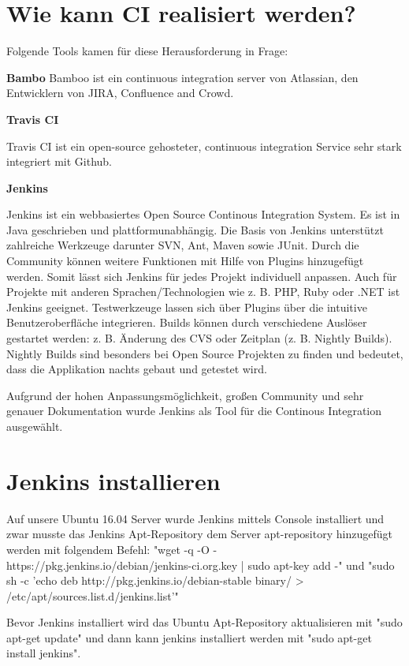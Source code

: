 \section{Wie kann CI realisiert werden?}\label{sec:whyci}
Folgende Tools kamen für diese Herausforderung in Frage:

\textbf{Bambo}
Bamboo ist ein continuous integration server von Atlassian, den Entwicklern von JIRA, Confluence and Crowd. 

\textbf{Travis CI}

Travis CI ist ein open-source gehosteter, continuous integration Service sehr stark integriert mit Github.

\textbf{Jenkins}

Jenkins ist ein webbasiertes Open Source Continous Integration System. Es ist in Java geschrieben und plattformunabhängig. Die Basis von Jenkins unterstützt zahlreiche Werkzeuge darunter SVN, Ant, Maven sowie JUnit. Durch die Community können weitere Funktionen mit Hilfe von Plugins hinzugefügt werden. Somit lässt sich Jenkins für jedes Projekt individuell anpassen. Auch für Projekte mit anderen Sprachen/Technologien wie z. B. PHP, Ruby oder .NET ist Jenkins geeignet. Testwerkzeuge lassen sich über Plugins über die intuitive Benutzeroberfläche integrieren. Builds können durch verschiedene Auslöser gestartet werden: z. B. Änderung des CVS oder Zeitplan (z. B. Nightly Builds). Nightly Builds sind besonders bei Open Source Projekten zu finden und bedeutet, dass die Applikation nachts gebaut und getestet wird.

Aufgrund der hohen Anpassungsmöglichkeit, großen Community und sehr genauer Dokumentation wurde Jenkins als Tool für die Continous Integration ausgewählt.

\section{Jenkins installieren}
\label{sec:jenkinsinstallation}
Auf unsere Ubuntu 16.04 Server wurde Jenkins mittels Console installiert und zwar musste das Jenkins Apt-Repository dem Server apt-repository hinzugefügt werden mit folgendem Befehl: "wget -q -O - https://pkg.jenkins.io/debian/jenkins-ci.org.key | sudo apt-key add -" und 
"sudo sh -c 'echo deb http://pkg.jenkins.io/debian-stable binary/ > /etc/apt/sources.list.d/jenkins.list'"

Bevor Jenkins installiert wird das Ubuntu Apt-Repository aktualisieren mit "sudo apt-get update" und dann kann jenkins installiert werden mit "sudo apt-get install jenkins".

